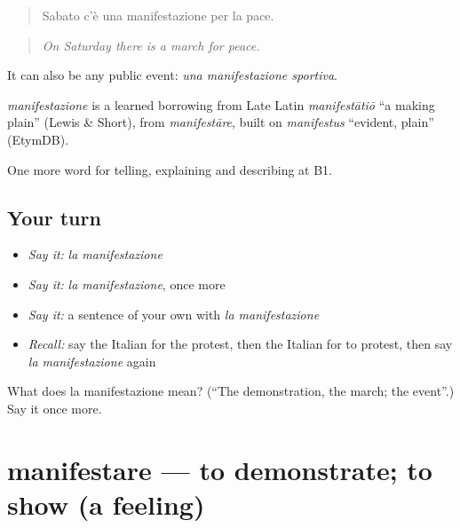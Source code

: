 \begin{quote}
Sabato c'è una manifestazione per la pace.
\end{quote}

\begin{quote}
\emph{On Saturday there is a march for peace.}
\end{quote}

It can also be any public event: \emph{una manifestazione sportiva}.

\begin{cousinweb}
\emph{manifestazione} is a learned borrowing from Late Latin \emph{manifestātiō} \textquotedblleft{}a making plain\textquotedblright{} (Lewis \& Short), from \emph{manifestāre}, built on \emph{manifestus} \textquotedblleft{}evident, plain\textquotedblright{} (EtymDB).
\end{cousinweb}

\begin{grammarlens}[title={What you've built}]
One more word for telling, explaining and describing at B1.
\end{grammarlens}

\subsection*{Your turn}
\begin{itemize}
\raggedright
  \item \emph{Say it:} \emph{la manifestazione}
  \item \emph{Say it:} \emph{la manifestazione}, once more
  \item \emph{Say it:} a sentence of your own with \emph{la manifestazione}
  \item \emph{Recall:} say the Italian for the protest, then the Italian for to protest, then say \emph{la manifestazione} again
\end{itemize}

\begin{tcolorbox}[breakable,colback=teal!4,colframe=teal!35!black,title={Before you move on}]
What does la manifestazione mean? (\textquotedblleft{}The demonstration, the march; the event\textquotedblright{}.) Say it once more.
\end{tcolorbox}
\section[manifestare]{manifestare — to demonstrate; to show (a feeling)}

\label{lesson:IT-C364-manifestare}



